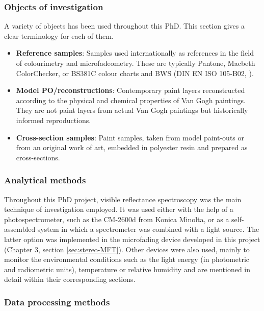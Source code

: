 \subsubsection{Objects of investigation}

A variety of objects has been used throughout this PhD. This section gives a clear terminology for each of them.

\begin{itemize}
    \item \textbf{Reference samples}: Samples used internationally as references in the field of colourimetry and microfadeometry. These are typically Pantone, Macbeth ColorChecker, or BS381C \citep{british_standards_institution_bs_1996} colour charts and \gls{BWS} (DIN EN ISO 105-B02, \citep{deutsches_institut_fur_normung_ev_din_2001}). 	
    \item \textbf{Model \gls{PO}/reconstructions}: Contemporary paint layers reconstructed according to the physical and chemical properties of Van Gogh paintings. They are not paint layers from actual Van Gogh paintings but historically informed reproductions.
    \item \textbf{Cross-section samples}: Paint samples, taken from model paint-outs or from an original work of art, embedded in polyester resin and prepared as cross-sections.
\end{itemize}
 
\subsubsection{Analytical methods}

Throughout this PhD project, visible reflectance spectroscopy was the main technique of investigation employed. It was used either with the help of a photospectrometer, such as the CM-2600d from Konica Minolta, or as a self-assembled system in which a spectrometer was combined with a light source. The latter option was implemented in the microfading device developed in this project (Chapter 3, section \ref{sec:stereo-MFT}). Other devices were also used, mainly to monitor the environmental conditions such as the light energy (in photometric and radiometric units), temperature or relative humidity and are mentioned in detail within their corresponding sections.\\


\subsubsection{Data processing methods}


